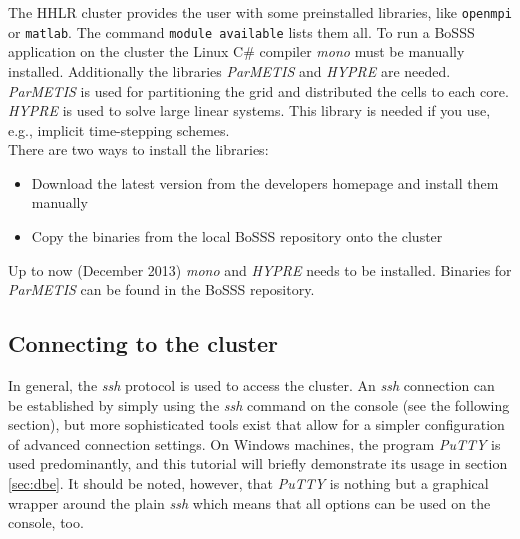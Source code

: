 \documentclass[11pt,twoside,a4paper]{fdyartcl}
\begin{document}
The HHLR cluster provides the user with some preinstalled libraries, like \verb|openmpi| or \verb|matlab|. The command \verb|module available|  lists them all. To run a BoSSS application on the cluster the Linux C\# compiler \emph{mono} must be manually installed. Additionally the libraries \emph{ParMETIS} and \emph{HYPRE} are needed. \emph{ParMETIS} is used for partitioning the grid and distributed the cells to each core. \emph{HYPRE} is used to solve large linear systems. This library is needed if you use, e.g., implicit time-stepping schemes.\\
There are two ways to install the libraries:
\begin{itemize}
\item Download the latest version from the developers homepage and install them manually
\item Copy the binaries from the local BoSSS repository onto the cluster 
\end{itemize}
Up to now (December 2013) \emph{mono} and \emph{HYPRE} needs to be installed. Binaries for \emph{ParMETIS} can be found in the BoSSS repository.

\subsection{Connecting to the cluster}
\label{sec:putty}
In general, the \emph{ssh} protocol is used to access the cluster. An \emph{ssh} connection can be established by simply using the \emph{ssh} command on the console (see the following section), but more sophisticated tools exist that allow for a simpler configuration of advanced connection settings. On Windows machines, the program \emph{PuTTY} is used predominantly, and this tutorial will briefly demonstrate its usage in section \ref{sec:dbe}. It should be noted, however, that \emph{PuTTY} is nothing but a graphical wrapper around the plain \emph{ssh} which means that all options can be used on the console, too.
\end{document}
